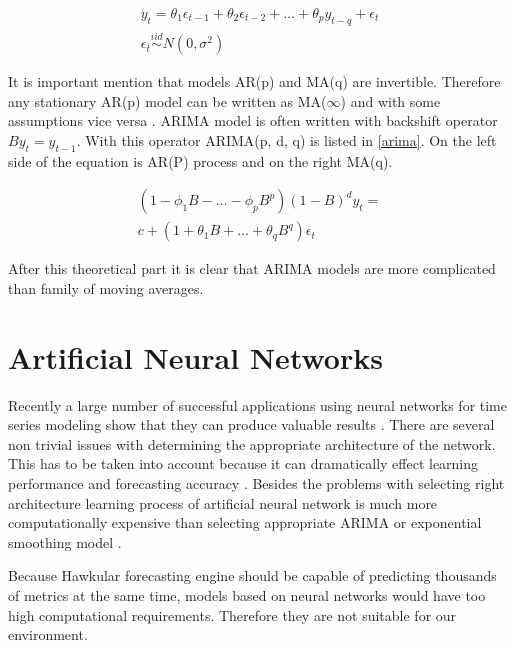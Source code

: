     \begin{eqnarray} \label{ma_model}
        y_t = \theta_1 \epsilon_{t-1} + \theta_2 \epsilon_{t-2} + \dots + \theta_p y_{t-q} + \epsilon_t \\ \nonumber
        \epsilon_t \overset{iid}{\sim} N(0, \sigma^2)
    \end{eqnarray}

    It is important mention that models AR(p) and MA(q) are invertible.
    Therefore any stationary AR(p) model can be written as MA($\infty$) and with some assumptions
    vice versa \cite{brockwell}. ARIMA model is often written with backshift operator $By_t=y_{t-1}$.
    With this operator ARIMA(p, d, q) is listed in \ref{arima}. On the left side of the equation is AR(P) process
    and on the right MA(q).

    \begin{eqnarray} \label{arima}
        (1- \phi_1B - \dots - \phi_pB^p)(1-B)^d y_t = \\ \nonumber
         c + (1+\theta_1B+\dots+\theta_qB^q) \epsilon_t
    \end{eqnarray}

    After this theoretical part it is clear that ARIMA models are more complicated than family of moving averages.

    \section{Artificial Neural Networks}
    Recently a large number of successful applications using neural networks for time series modeling show that they
    can produce valuable results \cite{ann-forecasting-state-art}. There are several non trivial issues with
    determining the appropriate architecture of the network. This has to be taken into account because it can
    dramatically effect learning performance and forecasting accuracy \cite{ann-model-selecting}.
    Besides the problems with selecting right architecture learning process of artificial neural network is much more
    computationally expensive than selecting appropriate ARIMA or exponential smoothing model \cite{ann-forecasting}.

    Because Hawkular forecasting engine should be capable of predicting thousands of metrics at the same time, models
    based on neural networks would have too high computational requirements. Therefore they are not suitable for our
    environment.


